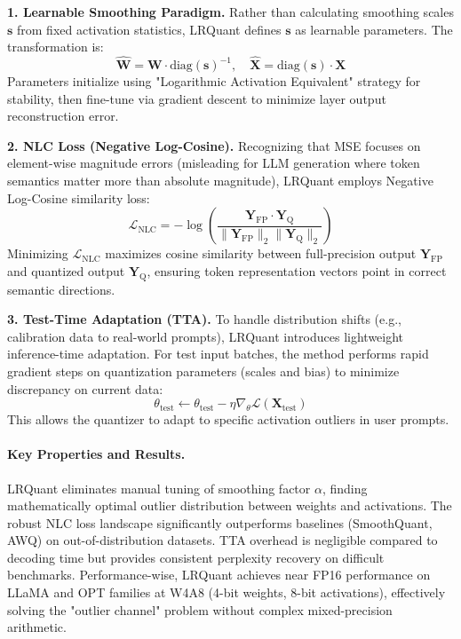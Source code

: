 \textbf{1. Learnable Smoothing Paradigm.} Rather than calculating smoothing scales $\mathbf{s}$ from fixed activation statistics, LRQuant defines $\mathbf{s}$ as learnable parameters. The transformation is:
\begin{equation}
\hat{\bm{W}} = \bm{W} \cdot \text{diag}(\mathbf{s})^{-1}, \quad \hat{\bm{X}} = \text{diag}(\mathbf{s}) \cdot \bm{X}
\end{equation}
Parameters initialize using "Logarithmic Activation Equivalent" strategy for stability, then fine-tune via gradient descent to minimize layer output reconstruction error.

\textbf{2. NLC Loss (Negative Log-Cosine).} Recognizing that MSE focuses on element-wise magnitude errors (misleading for LLM generation where token semantics matter more than absolute magnitude), LRQuant employs Negative Log-Cosine similarity loss:
\begin{equation}
\mathcal{L}_{\text{NLC}} = - \log \left( \frac{\bm{Y}_{\text{FP}} \cdot \bm{Y}_{\text{Q}}}{\| \bm{Y}_{\text{FP}} \|_2 \| \bm{Y}_{\text{Q}} \|_2} \right)
\end{equation}
Minimizing $\mathcal{L}_{\text{NLC}}$ maximizes cosine similarity between full-precision output $\bm{Y}_{\text{FP}}$ and quantized output $\bm{Y}_{\text{Q}}$, ensuring token representation vectors point in correct semantic directions.

\textbf{3. Test-Time Adaptation (TTA).} To handle distribution shifts (e.g., calibration data to real-world prompts), LRQuant introduces lightweight inference-time adaptation. For test input batches, the method performs rapid gradient steps on quantization parameters (scales and bias) to minimize discrepancy on current data:
\begin{equation}
\theta_{\text{test}} \leftarrow \theta_{\text{test}} - \eta \nabla_{\theta} \mathcal{L}(\bm{X}_{\text{test}})
\end{equation}
This allows the quantizer to adapt to specific activation outliers in user prompts.

\paragraph{Key Properties and Results.}
LRQuant eliminates manual tuning of smoothing factor $\alpha$, finding mathematically optimal outlier distribution between weights and activations. The robust NLC loss landscape significantly outperforms baselines (SmoothQuant, AWQ) on out-of-distribution datasets. TTA overhead is negligible compared to decoding time but provides consistent perplexity recovery on difficult benchmarks. Performance-wise, LRQuant achieves near FP16 performance on LLaMA and OPT families at W4A8 (4-bit weights, 8-bit activations), effectively solving the "outlier channel" problem without complex mixed-precision arithmetic.

